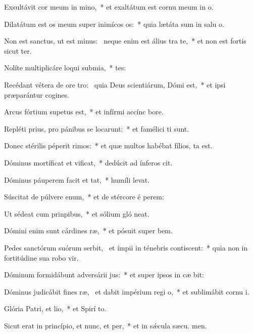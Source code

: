 \item Exsultávit cor meum in mino,~* et exaltátum est cornu meum in  o.
\item Dilatátum est os meum super inimícos os:~* quia lætáta sum in salu o.
\item Non est sanctus, ut est minus:~\pscross{} neque enim est álius tra te,~* et non est fortis sicut  ter.
\item Nolíte multiplicáre loqui submia,~* tes:
\item Recédant vétera de ore tro:~\pscross{} quia Deus scientiárum, Dómi est,~* et ipsi præparántur cogines.
\item Arcus fórtium supetus est,~* et infírmi accínc  bore.
\item Repléti prius, pro pánibus se locarunt:~* et famélici ti sunt.
\item Donec stérilis péperit rimos:~* et quæ multos habébat fílios, ta est.
\item Dóminus mortíficat et vificat,~* dedúcit ad ínferos  cit.
\item Dóminus páuperem facit et tat,~* humíli  levat.
\item Súscitat de púlvere enum,~* et de stércore é perem:
\item Ut sédeat cum prinpibus,~* et sólium gló neat.
\item Dómini enim sunt cárdines ræ,~* et pósuit super  bem.
\item Pedes sanctórum suórum serbit,~\pscross{} et ímpii in ténebris contiscent:~* quia non in fortitúdine sua robo vir.
\item Dóminum formidábunt adversárii jus:~* et super ipsos in cæ bit:
\item Dóminus judicábit fines ræ,~\pscross{} et dabit impérium regi o,~* et sublimábit cornu  i.
\item Glória Patri, et lio,~* et Spirí to.
\item Sicut erat in princípio, et nunc, et per,~* et in sǽcula sæcu. men.
